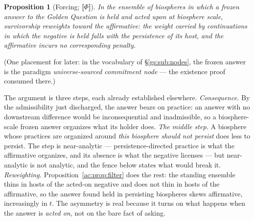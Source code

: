 \documentclass[11pt]{article}
\numberwithin{equation}{section}
\theoremstyle{plain}
\newtheorem{proposition}[theorem]{Proposition}
\theoremstyle{definition}
\theoremstyle{remark}
\begin{document}
\begin{proposition}[Forcing; \textbf{[$\Phi$]}]\label{ac:prop:forcing}
In the ensemble of biospheres in which a frozen answer to the Golden Question is held and acted upon at biosphere scale, survivorship reweights toward the affirmative: the weight carried by continuations in which the negative is held falls with the persistence of its host, and the affirmative incurs no corresponding penalty.
\end{proposition}

\noindent (One placement for later: in the vocabulary of
\S\ref{gs:sub:nodes}, the frozen answer is the paradigm
\emph{universe-sourced commitment node} --- the existence proof
consumed there.)

The argument is three steps, each already established elsewhere. \emph{Consequence.} By the admissibility just discharged, the answer bears on practice: an answer with no downstream difference would be inconsequential and inadmissible, so a biosphere-scale frozen answer organizes what its holder does. \emph{The middle step.} A biosphere whose practices are organized around \emph{this biosphere should not persist} does less to persist. The step is near-analytic --- persistence-directed practice is what the affirmative organizes, and its absence is what the negative licenses --- but near-analytic is not analytic, and the fence below states what would break it. \emph{Reweighting.} Proposition~\ref{ac:prop:filter} does the rest: the standing ensemble thins in hosts of the acted-on negative and does not thin in hosts of the affirmative, so the answer found held in persisting biospheres skews affirmative, increasingly in $t$. The asymmetry is real because it turns on what happens when the answer is \emph{acted on}, not on the bare fact of asking.
\end{document}
